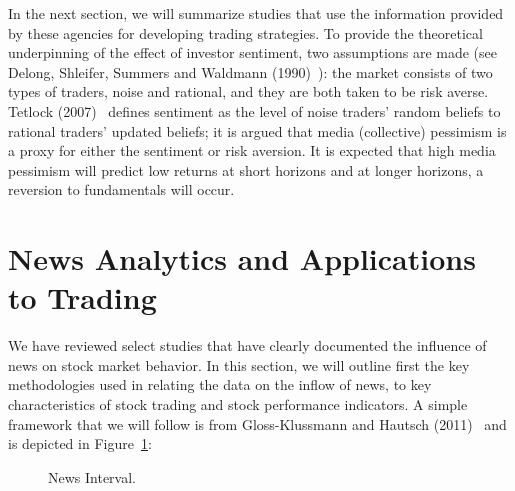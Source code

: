 In the next section, we will summarize studies that use the information provided by these agencies for developing trading strategies. To provide the theoretical underpinning of the effect of investor sentiment, two assumptions are made (see Delong, Shleifer, Summers and Waldmann (1990)~\cite{ssw}): the market consists of two types of traders, noise and rational, and they are both taken to be risk averse. Tetlock (2007)~\cite{tetlock2007giving} defines sentiment as the level of noise traders' random beliefs to rational traders' updated beliefs; it is argued that media (collective) pessimism is a proxy for either the sentiment or risk aversion. It is expected that high media pessimism will predict low returns at short horizons and at longer horizons, a reversion to fundamentals will occur. \label{in:sentag2}



\section{News Analytics and Applications to Trading}

We have reviewed select studies that have clearly documented the influence of news on stock market behavior. In this section, we will outline first the key methodologies used in relating the data on the inflow of news, to key characteristics of stock trading and stock performance indicators. A simple framework that we will follow is from Gloss-Klussmann and Hautsch (2011)~\cite{klub} and is depicted in Figure~\ref{fig:intervals}:
	
	\begin{figure}[!ht]
	\centering
	\caption{News Interval.\label{fig:intervals}}
	\end{figure}

